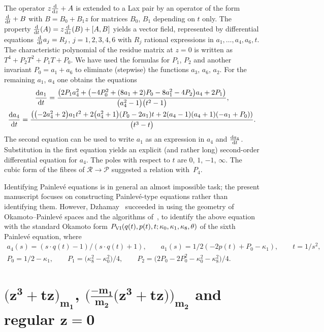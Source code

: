\documentclass[10pt,a4paper]{amsart}
\numberwithin{equation}{section}
\begin{document}
 The operator $z\frac{{\rm d}}{{\rm d}z}+A$ is extended to a Lax pair by an operator of the form $\frac{{\rm d}}{{\rm d}t}+B$ with $B=B_0+B_1z$ for matrices $B_0$, $B_1$ depending on $t$ only. The property $\frac{{\rm d}}{{\rm d}t}(A)=z\frac{{\rm d}}{{\rm d}z}(B)+[A,B]$ yields a vector field, represented by differential equations
 $\frac{{\rm d}}{{\rm d}t}a_j=R_j$, $ j=1,2,3,4,6$ with $R_j$ rational expressions in $a_1,\dots, a_4, a_6,t$. The characteristic polynomial of the residue matrix at $z=0$ is written as $T^4+P_2T^2+P_1T+P_0$. We have used the formulas for $P_1$, $P_2$ and another invariant $P_0=a_1+a_6$ to
 eliminate (stepwise) the functions $a_3$, $a_6$, $a_2$. For the remaining $a_1$, $a_4$ one obtains the equations
\begin{gather*}
\frac{{\rm d}a_1}{{\rm d}t}= \frac{\bigl(2P_1a_4^2 + \bigl(-4P_0^2 + (8a_1 + 2)P_0 - 8a_1^2 - 4P_2\bigr)a_4 + 2P_1\bigr)}{\bigl(a_4^2 - 1\bigr)\bigl(t^2 - 1\bigr)}, \\
 \frac{{\rm d}a_4}{{\rm d}t}= \frac{ \bigl(\bigl(-2a_4^2 + 2\bigr)a_1t^2 + 2\bigl(a_4^2 + 1\bigr)(P_0 - 2a_1)t + 2(a_4 - 1)(a_4 + 1)(-a_1 + P_0))} {\bigl(t^3 - t\bigr)}.
 \end{gather*}
The second equation can be used to write $a_1$ as an expression in $a_4$ and $\frac{{\rm d}a_4}{{\rm d}t}$. Substitution in the first equation
yields an explicit (and rather long) second-order differential equation for $a_4$. The poles with respect to $t$ are $0$, $1$, $-1$, $\infty$.
The cubic form of the fibres of $\mathcal{R}\rightarrow \mathcal{P}$ suggested a relation with~$P_4$.

 Identifying Painlev\'e equations is in general an almost impossible task; the present manuscript focuses on constructing Painlev\'e-type equations rather than identifying them. However, Dzha\-may~\cite{Dz} succeeded in using the
 geometry of Okamoto--Painlev\'e spaces and the algorithms of~\cite{D-F-L-S}, to identify the above equation with
 the standard Okamoto form $P_{\rm VI}(q(t), p(t), t; \kappa_0, \kappa_1, \kappa_8, \allowbreak\theta)$ of the sixth Painlev\'e
 equation, where
\begin{gather*}
a_4(s) = (s\cdot q(t) - 1)/(s \cdot q(t) + 1), \qquad a_1(s) = 1/2 (-2 p(t) + P_0 - \kappa_1 ),\qquad
t = 1/s^2,\\
 P_0 = 1/2 - \kappa_1,\qquad P_1 = \bigl(\kappa_8^2 - \kappa_0^2\bigr)/4,\qquad P_2 = \bigl(2P_0 - 2P_0^2 - \kappa_0^2 - \kappa_8^2\bigr)/4.
 \end{gather*}

\section[(z-cubed plus tz) with multiplicity m1, -m1*(z-cubed plus tz)/m2 with multiplicity m2 and regular z=0]{$\boldsymbol{\bigl(z^3+tz\bigr)_{m_1}}$, $\boldsymbol{\bigl(\frac{-m_1}{m_2}\bigl(z^3+tz\bigr)\bigr)_{m_2}}$ and regular $\boldsymbol{z=0}$}\label{six}
\end{document}
